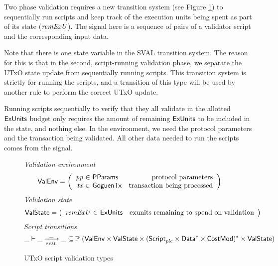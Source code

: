 Two phase validation requires a new transition system
(see Figure \ref{fig:ts-types:utxos}) to sequentially run
scripts and keep track of the execution units being spent as part of its state
($\mathit{remExU}$). The signal here is a sequence of pairs of a validator
script and the corresponding input data.

Note that there is one state variable in the SVAL transition system. The reason
for this is that in the second, script-running validation phase, we separate
the UTxO state update from sequentially running scripts. This transition
system is strictly for running the scripts, and a transition of this type
will be used by another rule to perform the correct UTxO update.

Running scripts sequentially
to verify that they all validate in the allotted $\mathsf{ExUnits}$ budget only requires
the amount of remaining $\mathsf{ExUnits}$ to be included in the state, and nothing else.
In the environment, we need the protocol parameters and the
transaction being validated. All other data needed
to run the scripts comes from the signal.

\begin{figure}[htb]
  \emph{Validation environment}
  \begin{equation*}
    \ValEnv =
    \left(
      \begin{array}{r@{~\in~}lr}
        \var{pp} & \PParams & \text{protocol parameters}\\
        \var{tx} & \GoguenTx & \text{transaction being processed} \\
      \end{array}
    \right)
  \end{equation*}
  \emph{Validation state}
  \begin{equation*}
    \ValState =
    \left(
      \begin{array}{r@{~\in~}lr}
        \var{remExU} & \ExUnits & \text{exunits remaining to spend on validation} \\
      \end{array}
    \right)
  \end{equation*}
  \emph{Script transitions}
  \begin{equation*}
    \_ \vdash
    \var{\_} \trans{sval}{\_} \var{\_}
    \subseteq \powerset (\ValEnv \times \ValState \times \seqof{(\ScriptPlutus\times\seqof{\Data}\times\CostMod)} \times \ValState)
  \end{equation*}
  \caption{UTxO script validation types}
  \label{fig:ts-types:utxos}
\end{figure}

